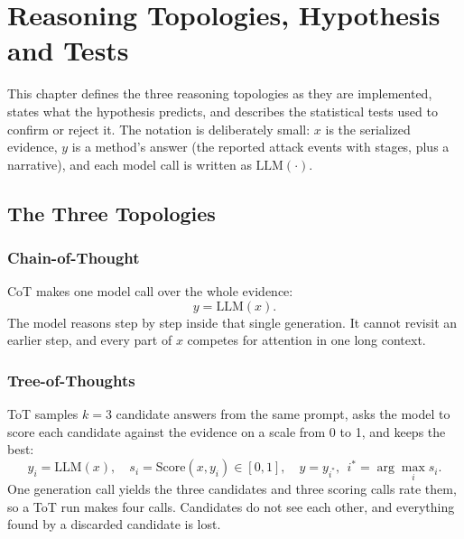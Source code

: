 \chapter{Reasoning Topologies, Hypothesis and Tests}
\label{ch:framework}

This chapter defines the three reasoning topologies as they are implemented, states what the hypothesis predicts, and describes the statistical tests used to confirm or reject it. The notation is deliberately small: $x$ is the serialized evidence, $y$ is a method's answer (the reported attack events with stages, plus a narrative), and each model call is written as $\mathrm{LLM}(\cdot)$.

\section{The Three Topologies}
\subsection{Chain-of-Thought}
CoT makes one model call over the whole evidence:
\begin{equation}
y=\mathrm{LLM}(x).
\end{equation}
The model reasons step by step inside that single generation. It cannot revisit an earlier step, and every part of $x$ competes for attention in one long context.

\subsection{Tree-of-Thoughts}
ToT samples $k=3$ candidate answers from the same prompt, asks the model to score each candidate against the evidence on a scale from 0 to 1, and keeps the best:
\begin{equation}
y_i=\mathrm{LLM}(x),\quad s_i=\mathrm{Score}(x,y_i)\in[0,1],\quad y=y_{i^\ast},\ \ i^\ast=\arg\max_i s_i .
\end{equation}
One generation call yields the three candidates and three scoring calls rate them, so a ToT run makes four calls. Candidates do not see each other, and everything found by a discarded candidate is lost.


